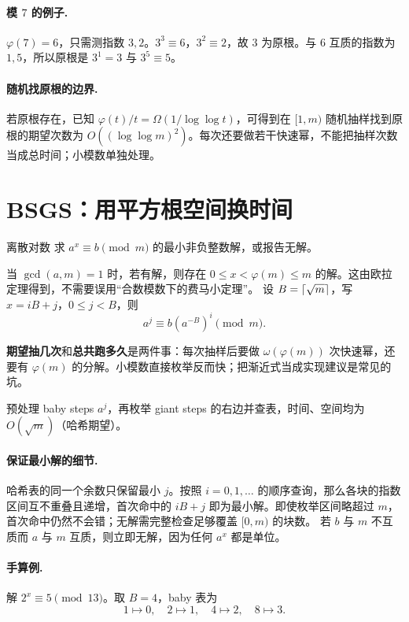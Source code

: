 \paragraph{模 $7$ 的例子.} $\varphi(7)=6$，只需测指数 $3,2$。$3^3\equiv6$，$3^2\equiv2$，故 $3$ 为原根。与 $6$ 互质的指数为 $1,5$，所以原根是 $3^1=3$ 与 $3^5\equiv5$。
\paragraph{随机找原根的边界.} 若原根存在，已知 $\varphi(t)/t=\Omega(1/\log\log t)$，可得到在 $[1,m)$ 随机抽样找到原根的期望次数为 $O((\log\log m)^2)$。每次还要做若干快速幂，不能把抽样次数当成总时间；小模数单独处理。


\section{BSGS：用平方根空间换时间}
\begin{problem}{离散对数}
求 $a^x\equiv b\pmod m$ 的最小非负整数解，或报告无解。
\end{problem}
当 $\gcd(a,m)=1$ 时，若有解，则存在 $0\le x<\varphi(m)\le m$ 的解。这由欧拉定理得到，不需要误用“合数模数下的费马小定理”。
设 $B=\left\lceil \sqrt m\right\rceil$，写 $x=iB+j$，$0\le j<B$，则
\[
 a^j\equiv b(a^{-B})^i\pmod m.
\]

\begin{tip}
\textbf{期望抽几次}和\textbf{总共跑多久}是两件事：每次抽样后要做 $\omega(\varphi(m))$ 次快速幂，还要有 $\varphi(m)$ 的分解。小模数直接枚举反而快；把渐近式当成实现建议是常见的坑。
\end{tip}

预处理 baby steps $a^j$，再枚举 giant steps 的右边并查表，时间、空间均为 $O(\sqrt m)$（哈希期望）。


\paragraph{保证最小解的细节.}
哈希表的同一个余数只保留最小 $j$。按照 $i=0,1,\ldots$ 的顺序查询，那么各块的指数区间互不重叠且递增，首次命中的 $iB+j$ 即为最小解。即使枚举区间略超过 $m$，首次命中仍然不会错；无解需完整检查足够覆盖 $[0,m)$ 的块数。
若 $b$ 与 $m$ 不互质而 $a$ 与 $m$ 互质，则立即无解，因为任何 $a^x$ 都是单位。

\paragraph{手算例.} 解 $2^x\equiv5\pmod{13}$。取 $B=4$，baby 表为
\[
1\mapsto0,\quad2\mapsto1,\quad4\mapsto2,\quad8\mapsto3.
\]

